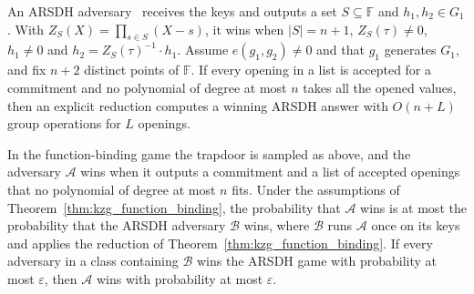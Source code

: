 \begin{theorem}\label{thm:kzg_function_binding}
\leanok
{}
An ARSDH adversary~\cite{CGKY25} receives the keys and outputs a set $S\subseteq\mathbb{F}$ and
$h_1,h_2\in G_1$. With $Z_S(X)=\prod_{s\in S}(X-s)$, it wins when $|S|=n+1$, $Z_S(\tau)\neq 0$,
$h_1\neq 0$ and $h_2=Z_S(\tau)^{-1}\cdot h_1$. Assume $e(g_1,g_2)\neq 0$ and that $g_1$
generates $G_1$, and fix $n+2$ distinct points of $\mathbb{F}$. If every opening in a list is
accepted for a commitment and no polynomial of degree at most $n$ takes all the opened values,
then an explicit reduction computes a winning ARSDH answer with $O(n+L)$ group operations for
$L$ openings.
\end{theorem}

\begin{corollary}\label{cor:kzg_function_binding_game}
\leanok
{}
In the function-binding game the trapdoor is sampled as above, and the adversary $\mathcal{A}$
wins when it outputs a commitment and a list of accepted openings that no polynomial of degree at
most $n$ fits. Under the assumptions of Theorem~\ref{thm:kzg_function_binding}, the probability
that $\mathcal{A}$ wins is at most the probability that the ARSDH adversary $\mathcal{B}$ wins,
where $\mathcal{B}$ runs $\mathcal{A}$ once on its keys and applies the reduction of
Theorem~\ref{thm:kzg_function_binding}. If every adversary in a class containing $\mathcal{B}$
wins the ARSDH game with probability at most $\varepsilon$, then $\mathcal{A}$ wins with
probability at most $\varepsilon$.
\end{corollary}
